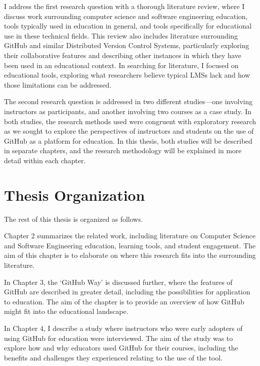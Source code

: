 
I address the first research question with a thorough literature review, where I discuss work surrounding computer science and software engineering education, tools typically used in education in general, and tools specifically for educational use in these technical fields. This review also includes literature surrounding GitHub and similar Distributed Version Control Systems, particularly exploring their collaborative features and describing other instances in which they have been used in an educational context. In searching for literature, I focused on educational tools, exploring what researchers believe typical LMSs lack and how those limitations can be addressed.

The second research question is addressed in two different studies---one involving instructors as participants, and another involving two courses as a case study. In both studies, the research methods used were congruent with exploratory research as we sought to explore the perspectives of instructors and students on the use of GitHub as a platform for education. In this thesis, both studies will be described in separate chapters, and the research methodology will be explained in more detail within each chapter.

\section{Thesis Organization}
The rest of this thesis is organized as follows.

Chapter 2 summarizes the related work, including literature on Computer Science and Software Engineering education, learning tools, and student engagement. The aim of this chapter is to elaborate on where this research fits into the surrounding literature.

In Chapter 3, the `GitHub Way' is discussed further, where the features of GitHub are described in greater detail, including the possibilities for application to education. The aim of the chapter is to provide an overview of how GitHub might fit into the educational landscape.

In Chapter 4, I describe a study where instructors who were early adopters of using GitHub for education were interviewed. The aim of the study was to explore how and why educators used GitHub for their courses, including the benefits and challenges they experienced relating to the use of the tool.

